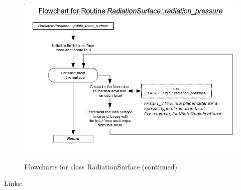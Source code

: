 \begin{figure}[!ht]
  \includegraphics[width = 6 in]{figs/flowchart/flow_radiation_pressure.png}
  \label{fig:flow_radiation_pressure}
  \caption{Flowcharts for class RadiationSurface (continued) }
  
\end{figure}
Links: \newline
{}\newline
{}\newline
\clearpage

